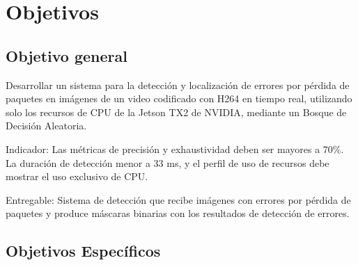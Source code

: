 
\chapter{Objetivos}
\label{chp:objetivos}

\section{Objetivo general}

Desarrollar un sistema para la detección y localización de errores por pérdida de paquetes en imágenes de un video codificado con H264 en tiempo real, utilizando solo los recursos de CPU de la Jetson TX2 de NVIDIA, mediante un Bosque de Decisión Aleatoria.

Indicador: Las métricas de precisión y exhaustividad deben ser mayores a 70\%. La duración de detección menor a 33 ms, y el perfil de uso de recursos debe mostrar el uso exclusivo de CPU.

Entregable: Sistema de detección que recibe imágenes con errores por pérdida de paquetes y produce máscaras binarias con los resultados de detección de errores.

\section{Objetivos Específicos}

